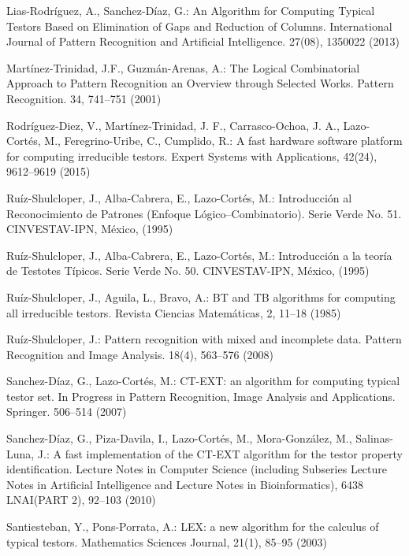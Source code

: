 \documentclass[citeauthoryear]{llncs}
\begin{document}
\begin{thebibliography}{}
	Lias-Rodr\'iguez, A., Sanchez-D\'iaz, G.:
 	An Algorithm for Computing Typical Testors Based on Elimination of Gaps and Reduction of Columns.
 	International Journal of Pattern Recognition and Artificial Intelligence. 27(08), 1350022 (2013)

	Mart\'inez-Trinidad, J.F., Guzm\'an-Arenas, A.: 
	The Logical Combinatorial Approach to Pattern Recognition an Overview through Selected Works. 
	Pattern Recognition. 34, 741--751 (2001)

	Rodríguez-Diez, V., Martínez-Trinidad, J. F., Carrasco-Ochoa, J. A., Lazo-Cortés, M., Feregrino-Uribe, C., Cumplido, R.:
	A fast hardware software platform for computing irreducible testors. 
	Expert Systems with Applications, 
	42(24), 9612–9619 (2015)

	Ruíz-Shulcloper, J., Alba-Cabrera, E., Lazo-Cort\'es, M.:
	Introducci\'{o}n al Reconocimiento de Patrones (Enfoque L\'{o}gico--Combinatorio). 
	Serie Verde No. 51. CINVESTAV-IPN, México, (1995)

	Ruíz-Shulcloper, J., Alba-Cabrera, E., Lazo-Cort\'es, M.:
	Introducci\'{o}n a la teor\'ia de Testotes T\'ipicos. 
	Serie Verde No. 50. CINVESTAV-IPN, México, (1995)
	
	Ruíz-Shulcloper, J., Aguila, L., Bravo, A.:
	BT and TB algorithms for computing all irreducible testors. 
	Revista Ciencias Matem\'{a}ticas, 2, 11--18 (1985)

	Ruíz-Shulcloper, J.:
	Pattern recognition with mixed and incomplete data. 
	Pattern Recognition and Image Analysis. 18(4), 563--576 (2008)
	
	Sanchez-D\'iaz, G., Lazo-Cort\'es, M.:
	CT-EXT: an algorithm for computing typical testor set. 
	In Progress in Pattern Recognition, Image Analysis and Applications. Springer. 506--514 (2007)

	Sanchez-D\'iaz, G., Piza-Davila, I., Lazo-Cort\'es, M., Mora-Gonz\'alez, M., Salinas-Luna, J.:
	A fast implementation of the CT-EXT algorithm for the testor property identification. 
	Lecture Notes in Computer Science (including Subseries Lecture Notes in Artificial Intelligence and 
	Lecture	Notes in Bioinformatics), 6438 LNAI(PART 2), 92--103 (2010)

	Santiesteban, Y., Pons-Porrata, A.:
	LEX: a new algorithm for the calculus of typical testors. 
	Mathematics Sciences Journal, 21(1), 85--95 (2003)

	
	
\end{thebibliography}
\end{document}
